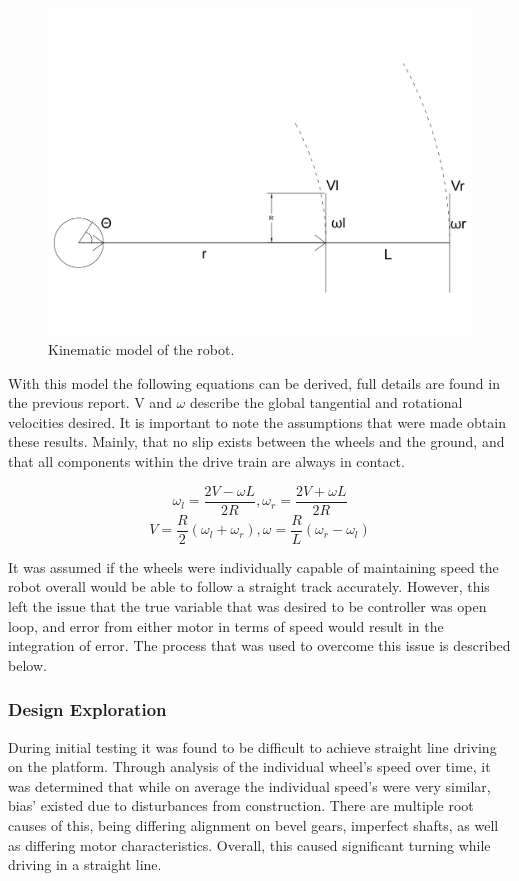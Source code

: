 \documentclass[ece]{uw-wkrpt}
\begin{document}
\begin{figure}
    \centering
    \includegraphics[width=5.5in]{res/diagram}
    \caption[Kinematic model of the robot]
          {Kinematic model of the robot.}
    \label{fig:kinematicModel}
\end{figure}

With this model the following equations can be derived, full details are found in the previous report. V and $\omega$ describe the global tangential and rotational velocities desired. It is important to note the assumptions that were made obtain these results. Mainly, that no slip exists between the wheels and the ground, and that all components within the drive train are always in contact.

\[\omega_l = \frac{2V-\omega L}{2R},\omega_r = \frac{2V+\omega L}{2R}\]
\[V=\frac{R}{2}(\omega_l+\omega_r),  \omega=\frac{R}{L}(\omega_r-\omega_l)\]

It was assumed if the wheels were individually capable of maintaining speed the robot overall would be able to follow a straight track accurately. However, this left the issue that the true variable that was desired to be controller was open loop, and error from either motor in terms of speed would result in the integration of error. The process that was used to overcome this issue is described below.

\subsubsection{Design Exploration}

During initial testing it was found to be difficult to achieve straight line driving on the platform. Through analysis of the individual wheel's speed over time, it was determined that while on average the individual speed's were very similar, bias' existed due to disturbances from construction. There are multiple root causes of this, being differing alignment on bevel gears, imperfect shafts, as well as differing motor characteristics. Overall, this caused significant turning while driving in a straight line.
\end{document}
